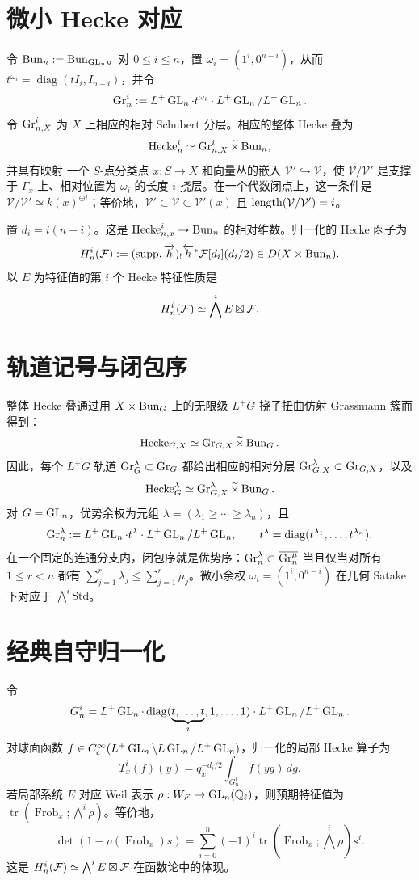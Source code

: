 \section{微小 Hecke 对应}\label{sec:2.8}
令 $\operatorname{Bun}_n:=\operatorname{Bun}_{\operatorname{GL}_n}$。对 $0\le i\le n$，置 $\omega_i=(1^i,0^{n-i})$，从而 $t^{\omega_i}=\operatorname{diag}(tI_i,I_{n-i})$，并令
\[\operatorname{Gr}_n^i:=L^+\operatorname{GL}_n\cdot t^{\omega_i}\cdot L^+\operatorname{GL}_n/L^+\operatorname{GL}_n.\]
令 $\operatorname{Gr}_{n,X}^i$ 为 $X$ 上相应的相对 Schubert 分层。相应的整体 Hecke 叠为
\[\operatorname{Hecke}_n^i\simeq\operatorname{Gr}_{n,X}^i\widetilde\times\operatorname{Bun}_n,\]
并具有映射
一个 $S$-点分类点 $x:S\to X$ 和向量丛的嵌入 $\mathcal V'\hookrightarrow\mathcal V$，使 $\mathcal V/\mathcal V'$ 是支撑于 $\Gamma_x$ 上、相对位置为 $\omega_i$ 的长度 $i$ 挠层。在一个代数闭点上，这一条件是 $\mathcal V/\mathcal V'\simeq k(x)^{\oplus i}$；等价地，$\mathcal V'\subset\mathcal V\subset\mathcal V'(x)$ 且 $\operatorname{length}(\mathcal V/\mathcal V')=i$。

置 $d_i=i(n-i)$。这是 $\operatorname{Hecke}_{n,x}^i\to\operatorname{Bun}_n$ 的相对维数。归一化的 Hecke 函子为
\[H_n^i(\mathcal{F}):=(\operatorname{supp},\overrightarrow h)_!\overleftarrow h^*\mathcal{F}[d_i](d_i/2)\in D(X\times\operatorname{Bun}_n).\]
以 $E$ 为特征值的第 $i$ 个 Hecke 特征性质是
\[H_n^i(\mathcal{F})\simeq\bigwedge^iE\boxtimes\mathcal{F}.\]
\section{轨道记号与闭包序}\label{sec:2.9}
整体 Hecke 叠通过用 $X\times\operatorname{Bun}_G$ 上的无限级 $L^+G$ 挠子扭曲仿射 Grassmann 簇而得到：
\[\operatorname{Hecke}_{G,X}\simeq\operatorname{Gr}_{G,X}\widetilde\times\operatorname{Bun}_G.\]
因此，每个 $L^+G$ 轨道 $\operatorname{Gr}_G^\lambda\subset\operatorname{Gr}_G$ 都给出相应的相对分层 $\operatorname{Gr}_{G,X}^\lambda\subset\operatorname{Gr}_{G,X}$，以及
\[\operatorname{Hecke}_G^\lambda\simeq\operatorname{Gr}_{G,X}^\lambda\widetilde\times\operatorname{Bun}_G.\]
对 $G=\operatorname{GL}_n$，优势余权为元组 $\lambda=(\lambda_1\ge\cdots\ge\lambda_n)$，且
\[\operatorname{Gr}_n^\lambda:=L^+\operatorname{GL}_n\cdot t^\lambda\cdot L^+\operatorname{GL}_n/L^+\operatorname{GL}_n,\qquad t^\lambda=\operatorname{diag}(t^{\lambda_1},\ldots,t^{\lambda_n}).\]
在一个固定的连通分支内，闭包序就是优势序：$\operatorname{Gr}_n^\lambda\subset\overline{\operatorname{Gr}_n^\mu}$ 当且仅当对所有 $1\le r<n$ 都有 $\sum_{j=1}^r\lambda_j\le\sum_{j=1}^r\mu_j$。微小余权 $\omega_i=(1^i,0^{n-i})$ 在几何 Satake 下对应于 $\bigwedge^i\mathrm{Std}$。
\section{经典自守归一化}\label{sec:2.10}
令
\[G_n^i=L^+\operatorname{GL}_n\cdot\operatorname{diag}(\underbrace{t,\ldots,t}_{i},1,\ldots,1)\cdot L^+\operatorname{GL}_n/L^+\operatorname{GL}_n.\]
对球面函数 $f\in C_c^\infty(L^+\operatorname{GL}_n\backslash L\operatorname{GL}_n/L^+\operatorname{GL}_n)$，归一化的局部 Hecke 算子为
\[T_x^i(f)(y)=q_x^{-d_i/2}\int_{G_n^i}f(yg)\,dg.\]
若局部系统 $E$ 对应 Weil 表示 $\rho:W_F\to\operatorname{GL}_n(\mathbb Q_\ell)$，则预期特征值为 $\operatorname{tr}(\operatorname{Frob}_x;\bigwedge^i\rho)$。等价地，
\[\det(1-\rho(\operatorname{Frob}_x)s)=\sum_{i=0}^n(-1)^i\operatorname{tr}(\operatorname{Frob}_x;\bigwedge^i\rho)s^i.\]
这是 $H_n^i(\mathcal{F})\simeq\bigwedge^iE\boxtimes\mathcal{F}$ 在函数论中的体现。
